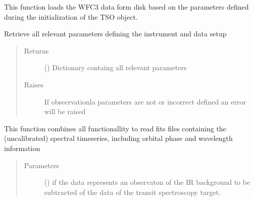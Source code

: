 \documentclass[a4paper,10pt,english]{sphinxmanual}
\begin{document}
\begin{fulllineitems}

\begin{fulllineitems}
\label{\detokenize{cascade.instruments:cascade.instruments.instruments.HSTWFC3.load_data}}
This function loads the WFC3 data form disk based on the
parameters defined during the initialization of the TSO object.

\end{fulllineitems}


\begin{fulllineitems}
\label{\detokenize{cascade.instruments:cascade.instruments.instruments.HSTWFC3.get_instrument_setup}}
Retrieve all relevant parameters defining the instrument and data setup
\begin{quote}\begin{description}
\item[{Returns}] \leavevmode
{} () \textendash{} Dictionary containg all relevant parameters

\item[{Raises}] \leavevmode
{} \textendash{} If obseervationla parameters are not or incorrect defined an
error will be raised

\end{description}\end{quote}

\end{fulllineitems}


\begin{fulllineitems}
\label{\detokenize{cascade.instruments:cascade.instruments.instruments.HSTWFC3.get_spectra}}
This function combines all functionallity to read fits files
containing the (uncalibrated) spectral timeseries, including
orbital phase and wavelength information
\begin{quote}\begin{description}
\item[{Parameters}] \leavevmode
{} () \textendash{} if  the data represents an observaton of the IR background
to be subtracted of the data of the transit spectroscopy target.


\end{description}
\end{quote}
\end{fulllineitems}
\end{fulllineitems}
\end{document}
